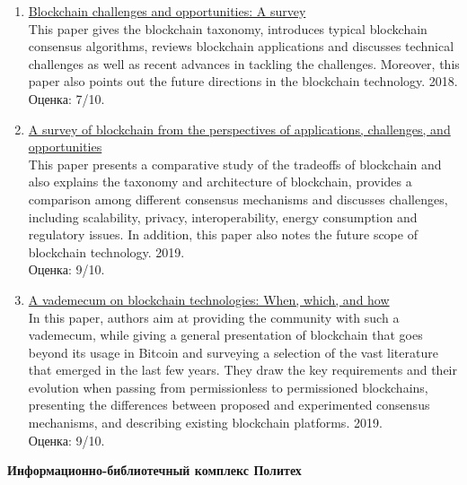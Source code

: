 \documentclass[a4paper, 12pt]{report}		%
\begin{document}
\begin{enumerate}
\item \href{https://allquantor.at/blockchainbib/pdf/zheng2018blockchain.pdf}{Blockchain challenges and opportunities: A survey}\\
This paper gives the blockchain taxonomy, introduces typical blockchain consensus algorithms, reviews blockchain applications and discusses technical challenges as well as recent advances in tackling the challenges. Moreover, this paper also points out the future directions in the blockchain technology. 2018.\\
Оценка: 7/10.
\item \href{https://ieeexplore.ieee.org/abstract/document/8805074}{A survey of blockchain from the perspectives of applications, challenges, and opportunities}\\
 This paper presents a comparative study of the tradeoffs of blockchain and also explains the taxonomy and architecture of blockchain, provides a comparison among different consensus mechanisms and discusses challenges, including scalability, privacy, interoperability, energy consumption and regulatory issues. In addition, this paper also notes the future scope of blockchain technology. 2019.\\
Оценка: 9/10.
\item \href{https://ieeexplore.ieee.org/abstract/document/8760539}{A vademecum on blockchain technologies: When, which, and how}\\
In this paper, authors aim at providing the community with such a vademecum, while giving a general presentation of blockchain that goes beyond its usage in Bitcoin and surveying a selection of the vast literature that emerged in the last few years. They draw the key requirements and their evolution when passing from permissionless to permissioned blockchains, presenting the differences between proposed and experimented consensus mechanisms, and describing existing blockchain platforms. 2019.\\
Оценка: 9/10.
\end{enumerate}

\textbf{Информационно-библиотечный комплекс Политех}
\end{document}

